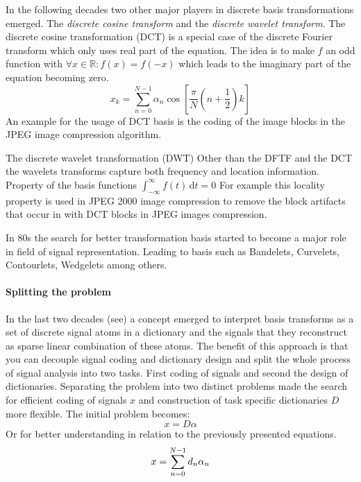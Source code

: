 In the following decades two other major players in discrete basis
transformations emerged. The \emph{discrete cosine transform} and the
\emph{discrete wavelet transform}. 
The discrete cosine transformation (DCT) is a special case of the discrete
Fourier transform which only uses real part of the equation. The idea is to make
$f$ an odd function with $\forall x \in \mathbb{R} : f(x) = f(-x)$ which leads
to the imaginary part of the equation becoming zero.
\begin{equation*}
x_k = \sum_{n=0}^{N-1}\alpha_n\cos \left[ \frac{\pi}{N} \left(
n+\frac{1}{2}\right) k\right]
\end{equation*}
An example for the usage of DCT basis is the coding of the image blocks in the
JPEG image compression algorithm.

The discrete wavelet transformation (DWT)
Other than the DFTF and the DCT the wavelets transforms capture both frequency
and location information. 
 Property of the basis functions 
$\int_{-\infty}^{\infty} \! f(t) \, \mathrm{d}t = 0$
For example this locality property is used in JPEG 2000 image compression to
remove the block artifacts that occur in with DCT blocks in JPEG images
compression. 

In 80s the search for better transformation basis started to become a major role
in field of signal representation. Leading to basis such as Bandelets,
Curvelets, Contourlets, Wedgelets among others.

\paragraph{Splitting the problem}
\cite{Rubinstein2010}
In the last two decades (see\cite{Olshausen1996,Mallat1993}) a concept emerged
to interpret basis transforms as a set of discrete signal atoms in a dictionary
and the signals that they reconstruct as sparse linear combination of these
atoms. The benefit of this approach is that you can decouple signal coding and
dictionary design and split the whole process of signal analysis into two tasks.
First coding of signals and second the design of dictionaries. Separating the
problem into two distinct problems made the search for efficient coding of
signals $x$ and construction of task specific dictionaries $D$ more
flexible. The initial problem becomes:
\begin{equation}
 x  = D\alpha
\end{equation}
Or for better understanding in relation to the previously presented
equations.
\begin{equation}
x = \sum_{n=0}^{N-1}d_n\alpha_n\notag
\end{equation}

